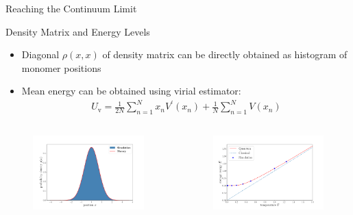 \documentclass[final,hyperref={pdfpagelabels=false}]{beamer}
\begin{document}
\begin{frame}[t]
\begin{columns}[t]
\begin{column}{.48\textwidth}
\begin{block}{Reaching the Continuum Limit}
\end{block}

\begin{block}{Density Matrix and Energy Levels}
\begin{itemize}
\item Diagonal $\rho(x,x)$ of density matrix can be directly obtained as histogram of monomer positions
\item Mean energy can be obtained using virial estimator:
\begin{align*}
U_{\text{v}}=\frac{1}{2N} \sum_{n=1}^N x_n V^{\prime}\left(x_n\right)+\frac{1}{N} \sum_{n=1}^N V\left(x_n\right)
\end{align*}
\end{itemize}

\begin{columns}[T,onlytextwidth]
\begin{figure}[H]
\centering
\includegraphics[width=\textwidth]{figures/density_matrix.pdf}
\end{figure}

\begin{figure}[H]
\centering
\includegraphics[width=\textwidth]{figures/energy.pdf}
\end{figure}
\end{columns}


\end{block}
\end{column}
\end{columns}
\end{frame}
\end{document}
